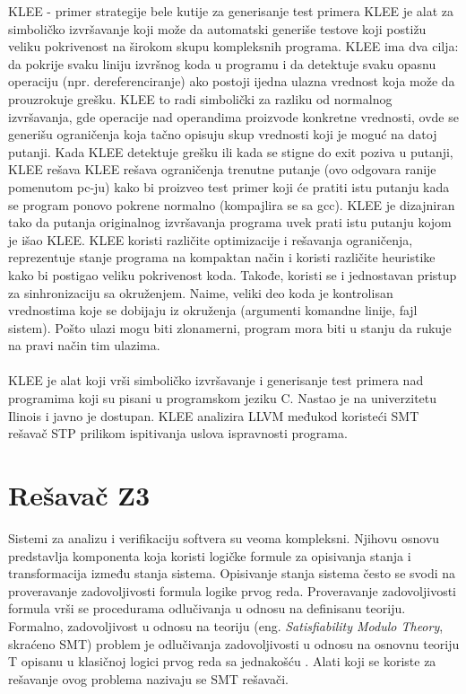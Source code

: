 \documentclass[12pt,oneside]{memoir}
\begin{document}
KLEE - primer strategije bele kutije za generisanje test primera
KLEE je alat za simboličko izvršavanje koji može da automatski generiše testove koji postižu veliku pokrivenost na širokom skupu kompleksnih programa. KLEE ima dva cilja: da pokrije svaku liniju izvršnog koda u programu i da detektuje svaku opasnu operaciju (npr. dereferenciranje) ako postoji ijedna ulazna vrednost koja može da prouzrokuje grešku. KLEE to radi simbolički za razliku od normalnog izvršavanja, gde operacije nad operandima proizvode konkretne vrednosti, ovde se generišu ograničenja koja tačno opisuju skup vrednosti koji je moguć na datoj putanji. Kada KLEE detektuje grešku ili kada se stigne do exit poziva u putanji, KLEE rešava KLEE rešava ograničenja trenutne putanje (ovo odgovara ranije pomenutom pc-ju) kako bi proizveo test primer koji će pratiti istu putanju kada se program ponovo pokrene normalno (kompajlira se sa gcc). KLEE je dizajniran tako da putanja originalnog izvršavanja programa uvek prati istu putanju kojom je išao KLEE. KLEE koristi različite optimizacije i rešavanja ograničenja, reprezentuje stanje programa na kompaktan način i koristi različite heuristike kako bi postigao veliku pokrivenost koda. Takođe, koristi se i jednostavan pristup za sinhronizaciju sa okruženjem. Naime, veliki deo koda je kontrolisan vrednostima koje se dobijaju iz okruženja (argumenti komandne linije, fajl sistem). Pošto ulazi mogu biti zlonamerni, program mora biti u stanju da rukuje na pravi način tim ulazima. \\ \\
KLEE je alat koji vrši simboličko izvršavanje i generisanje test primera nad programima koji su pisani u programskom jeziku C. Nastao je na univerzitetu Ilinois i javno je dostupan. KLEE analizira LLVM međukod koristeći SMT rešavač STP prilikom ispitivanja uslova ispravnosti programa.
 
\chapter{Rešavač Z3}
\label{chp:razrada}

Sistemi za analizu i verifikaciju softvera su veoma kompleksni. Njihovu osnovu predstavlja komponenta koja koristi logičke formule za opisivanja stanja i transformacija između stanja sistema. Opisivanje stanja sistema često se svodi na proveravanje zadovoljivosti formula logike prvog reda. 
Proveravanje zadovoljivosti formula vrši se procedurama odlučivanja u odnosu na definisanu teoriju. Formalno, zadovoljivost u odnosu na teoriju (eng. \textit{Satisfiability Modulo Theory}, skraćeno SMT) problem je odlučivanja zadovoljivosti u odnosu na osnovnu teoriju T opisanu u klasičnoj logici prvog reda sa jednakošću \cite{Barrett}. Alati koji se koriste za rešavanje ovog problema nazivaju se SMT rešavači. 
\par
\end{document}
